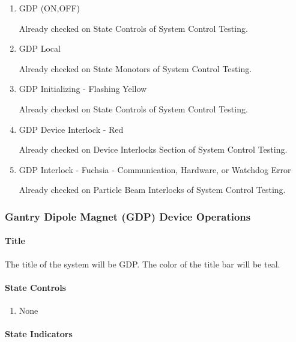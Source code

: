 \documentclass[11pt]{book}		%
\begin{document}
\begin{enumerate}
 \item GDP (ON,OFF)

\color{red}
Already checked on State Controls of System Control Testing.
\color{black}

 \item GDP Local

\color{red}
Already checked on State Monotors of System Control Testing.
\color{black}

 \item GDP Initializing - Flashing Yellow

\color{red}
Already checked on State Controls of System Control Testing.
\color{black}

 \item GDP Device Interlock - Red

\color{red}
Already checked on Device Interlocks Section of System Control Testing.
\color{black}

 \item GDP Interlock - Fuchsia - Communication, Hardware, or Watchdog Error

\color{red}
Already checked on Particle Beam Interlocks of System Control Testing.
\color{black}

\end{enumerate}

\subsubsection{Gantry Dipole Magnet (GDP) Device Operations}

\paragraph{Title} \label{sect:cyc-op-interface-ops-terminal-device-ops-gcc-title}

The title of the system will be GDP.  The color of the title bar will be teal.

\paragraph{State Controls}

\begin{enumerate}
\item None
\end{enumerate}

\paragraph{State Indicators}
\end{document}

